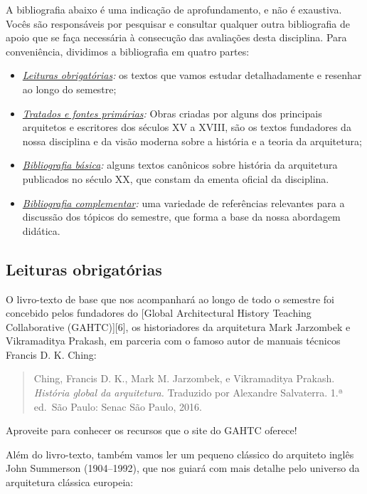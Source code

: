 \documentclass[
  11pt,
  brazil,
  a4paper,
]{article}
\providecommand{\tightlist}{%
  \setlength{\itemsep}{0pt}\setlength{\parskip}{0pt}}
\begin{document}
A bibliografia abaixo é uma indicação de aprofundamento, e não é
exaustiva. Vocês são responsáveis por pesquisar e consultar qualquer
outra bibliografia de apoio que se faça necessária à consecução das
avaliações desta disciplina. Para conveniência, dividimos a bibliografia
em quatro partes:

\begin{itemize}
\tightlist
\item
  \emph{\protect\hyperlink{leituras-obrigatuxf3rias}{Leituras
  obrigatórias}:} os textos que vamos estudar detalhadamente e resenhar
  ao longo do semestre;
\item
  \emph{\href{biblio-fontes.md}{Tratados e fontes primárias}:} Obras
  criadas por alguns dos principais arquitetos e escritores dos séculos
  XV a XVIII, são os textos fundadores da nossa disciplina e da visão
  moderna sobre a história e a teoria da arquitetura;
\item
  \emph{\href{biblio-basica.md}{Bibliografia básica}:} alguns textos
  canônicos sobre história da arquitetura publicados no século XX, que
  constam da ementa oficial da disciplina.
\item
  \emph{\href{biblio-complementar.md}{Bibliografia complementar}:} uma
  variedade de referências relevantes para a discussão dos tópicos do
  semestre, que forma a base da nossa abordagem didática.
\end{itemize}

\hypertarget{leituras-obrigatuxf3rias}{%
\subsection{Leituras obrigatórias}\label{leituras-obrigatuxf3rias}}

O livro-texto de base que nos acompanhará ao longo de todo o semestre
foi concebido pelos fundadores do {[}Global Architectural History
Teaching Collaborative (GAHTC){]}{[}6{]}, os historiadores da
arquitetura Mark Jarzombek e Vikramaditya Prakash, em parceria com o
famoso autor de manuais técnicos Francis D. K. Ching:

\begin{quote}
Ching, Francis D. K., Mark M. Jarzombek, e Vikramaditya Prakash.
\emph{História global da arquitetura.} Traduzido por Alexandre
Salvaterra. 1.ª ed.~São Paulo: Senac São Paulo, 2016.
\end{quote}

Aproveite para conhecer os recursos que o site do GAHTC oferece!

Além do livro-texto, também vamos ler um pequeno clássico do arquiteto
inglês John Summerson (1904--1992), que nos guiará com mais detalhe pelo
universo da arquitetura clássica europeia:
\end{document}
